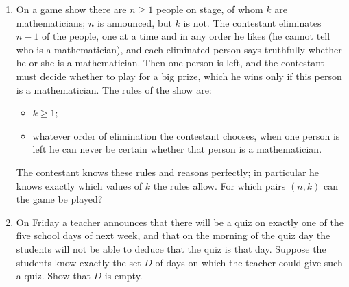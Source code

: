 \begin{enumerate}
\item[(a)] On a game show there are $n\ge1$ people on stage, of whom $k$ are mathematicians; $n$ is announced, but $k$ is not. The contestant eliminates $n-1$ of the people, one at a time and in any order he likes (he cannot tell who is a mathematician), and each eliminated person says truthfully whether he or she is a mathematician. Then one person is left, and the contestant must decide whether to play for a big prize, which he wins only if this person is a mathematician. The rules of the show are:
\begin{itemize}
\item[(1)] $k\ge1$;
\item[(2)] whatever order of elimination the contestant chooses, when one person is left he can never be certain whether that person is a mathematician.
\end{itemize}
The contestant knows these rules and reasons perfectly; in particular he knows exactly which values of $k$ the rules allow. For which pairs $(n,k)$ can the game be played?
\item[(b)] On Friday a teacher announces that there will be a quiz on exactly one of the five school days of next week, and that on the morning of the quiz day the students will not be able to deduce that the quiz is that day. Suppose the students know exactly the set $D$ of days on which the teacher could give such a quiz. Show that $D$ is empty.
\end{enumerate}
